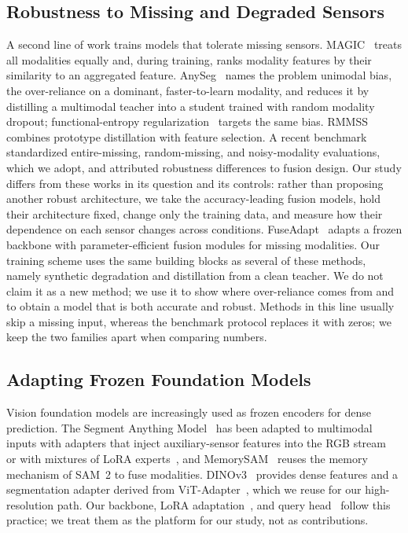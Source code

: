 \subsection{Robustness to Missing and Degraded Sensors}
A second line of work trains models that tolerate missing sensors. MAGIC~\cite{magic2024,magicpp2024} treats all modalities equally and, during training, ranks modality features by their similarity to an aggregated feature. AnySeg~\cite{anyseg2024} names the problem unimodal bias, the over-reliance on a dominant, faster-to-learn modality, and reduces it by distilling a multimodal teacher into a student trained with random modality dropout; functional-entropy regularization~\cite{zheng2025entropy} targets the same bias. RMMSS~\cite{rmmss2025} combines prototype distillation with feature selection. A recent benchmark~\cite{mmssbench2025} standardized entire-missing, random-missing, and noisy-modality evaluations, which we adopt, and attributed robustness differences to fusion design. Our study differs from these works in its question and its controls: rather than proposing another robust architecture, we take the accuracy-leading fusion models, hold their architecture fixed, change only the training data, and measure how their dependence on each sensor changes across conditions. FuseAdapt~\cite{fuseadapt2026} adapts a frozen backbone with parameter-efficient fusion modules for missing modalities. Our training scheme uses the same building blocks as several of these methods, namely synthetic degradation and distillation from a clean teacher. We do not claim it as a new method; we use it to show where over-reliance comes from and to obtain a model that is both accurate and robust. Methods in this line usually skip a missing input, whereas the benchmark protocol replaces it with zeros; we keep the two families apart when comparing numbers.

\subsection{Adapting Frozen Foundation Models}
Vision foundation models are increasingly used as frozen encoders for dense prediction. The Segment Anything Model~\cite{sam2023} has been adapted to multimodal inputs with adapters that inject auxiliary-sensor features into the RGB stream~\cite{mmsamadapter2025} or with mixtures of LoRA experts~\cite{mlesam}, and MemorySAM~\cite{memorysam2025} reuses the memory mechanism of SAM~2 to fuse modalities. DINOv3~\cite{dinov3_2025} provides dense features and a segmentation adapter derived from ViT-Adapter~\cite{vitadapter2023}, which we reuse for our high-resolution path. Our backbone, LoRA adaptation~\cite{lora2022}, and query head~\cite{mask2former2022} follow this practice; we treat them as the platform for our study, not as contributions.
